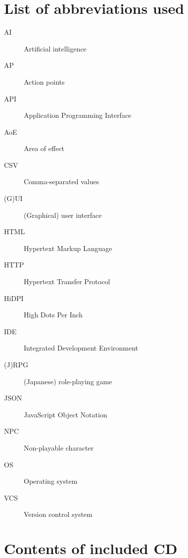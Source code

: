 \documentclass[thesis=B,english,hidelinks]{FITthesisXE}[2012/06/26]
\begin{document}
\appendix

\chapter{List of abbreviations used}
\begin{description}
\item[AI] Artificial intelligence
\item[AP] Action points
\item[API] Application Programming Interface
\item[AoE] Area of effect
\item[CSV] Comma-separated values
\item[(G)UI] (Graphical) user interface
\item[HTML] Hypertext Markup Language
\item[HTTP] Hypertext Transfer Protocol
\item[HiDPI] High Dots Per Inch
\item[IDE] Integrated Development Environment
\item[(J)RPG] (Japanese) role-playing game
\item[JSON] JavaScript Object Notation
\item[NPC] Non-playable character
\item[OS] Operating system
\item[VCS] Version control system
\end{description}

\chapter{Contents of included CD}

\begin{figure}
\end{figure}
\end{document}
